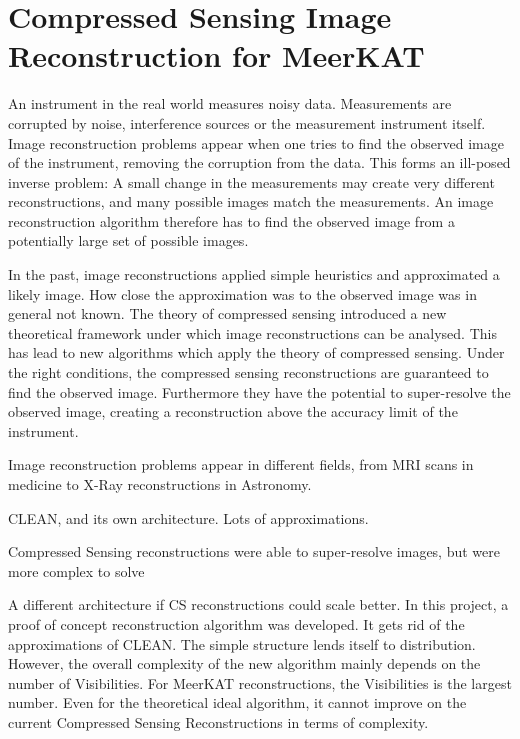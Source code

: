 \section{Compressed Sensing Image Reconstruction for MeerKAT} \label{intro}
An instrument in the real world measures noisy data. Measurements are corrupted by noise, interference sources or the measurement instrument itself. Image reconstruction problems appear when one tries to find the observed image of the instrument, removing the corruption from the data. This forms an ill-posed inverse problem: A small change in the measurements may create very different reconstructions, and many possible images match the measurements. An image reconstruction algorithm therefore has to find the observed image from a potentially large set of possible images.

In the past, image reconstructions applied simple heuristics and approximated a likely image. How close the approximation was to the observed image was in general not known. The theory of compressed sensing\cite{candes2006robust}\cite{donoho2006compressed} introduced a new theoretical framework under which image reconstructions can be analysed. This has lead to new algorithms which apply the theory of compressed sensing. Under the right conditions, the compressed sensing reconstructions are guaranteed to find the observed image. Furthermore they have the potential to super-resolve the observed image, creating a reconstruction above the accuracy limit of the instrument.

Image reconstruction problems appear in different fields, from MRI scans in medicine to X-Ray reconstructions in Astronomy. 

CLEAN, and its own architecture. Lots of approximations.

Compressed Sensing reconstructions were able to super-resolve images, but were more complex to solve

A different architecture if CS reconstructions could scale better. In this project, a proof of concept reconstruction algorithm was developed. It gets rid of the approximations of CLEAN. The simple structure lends itself to distribution. However, the overall complexity of the new algorithm mainly depends on the number of Visibilities. For MeerKAT reconstructions, the Visibilities is the largest number. Even for the theoretical ideal algorithm, it cannot improve on the current Compressed Sensing Reconstructions in terms of complexity. 



